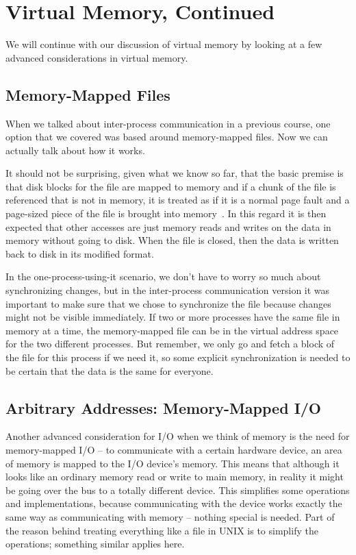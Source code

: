 




\section*{Virtual Memory, Continued}

We will continue with our discussion of virtual memory by looking at a few advanced considerations in virtual memory.

\subsection*{Memory-Mapped Files}
When we talked about inter-process communication in a previous course, one option that we covered was based around memory-mapped files. Now we can actually talk about how it works.

It should not be surprising, given what we know so far, that the basic premise is that disk blocks for the file are mapped to memory and if a chunk of the file is referenced that is not in memory, it is treated as if it is a normal page fault and a page-sized piece of the file is brought into memory~\cite{osc}. In this regard it is then expected that other accesses are just memory reads and writes on the data in memory without going to disk. When the file is closed, then the data is written back to disk in its modified format. 

In the one-process-using-it scenario, we don't have to worry so much about synchronizing changes, but in the inter-process communication version it was important to make sure that we chose to synchronize the file because changes might not be visible immediately. If two or more processes have the same file in memory at a time, the memory-mapped file can be in the virtual address space for the two different processes. But remember, we only go and fetch a block of the file for this process if we need it, so some explicit synchronization is needed to be certain that the data is the same for everyone.

\subsection*{Arbitrary Addresses: Memory-Mapped I/O}
Another advanced consideration for I/O when we think of memory is the need for memory-mapped I/O -- to communicate with a certain hardware device, an area of memory is mapped to the I/O device's memory. This means that although it looks like an ordinary memory read or write to main memory, in reality it might be going over the bus to a totally different device. This simplifies some operations and implementations, because communicating with the device works exactly the same way as communicating with memory -- nothing special is needed.  Part of the reason behind treating everything like a file in UNIX is to simplify the operations; something similar applies here.

